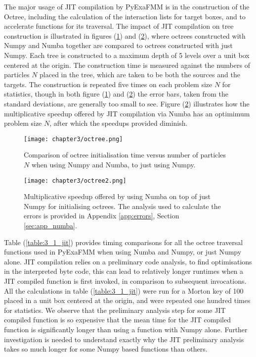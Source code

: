 The major usage of \gls{JIT} compilation by \gls{PyExaFMM} is in the construction
of the Octree, including the calculation of the interaction lists for target
boxes, and to accelerate functions for its traversal. The impact of \gls{JIT}
compilation on tree construction is illustrated in figures
(\ref{fig:3_1_octree}) and (\ref{fig:3_1_octree2}), where octrees constructed with
Numpy and Numba together are compared to octrees constructed with just Numpy.
Each tree is constructed to a maximum depth of 5 levels over a unit box
centered at the origin. The construction time is measured against
the numbers of particles $N$ placed in the tree, which are taken to be
both the sources and the targets. The construction
is repeated five times on each problem size $N$ for statistics, though in both
figure (\ref{fig:3_1_octree}) and (\ref{fig:3_1_octree2}) the error bars, taken
from the standard deviations, are generally too small to see. Figure (\ref{fig:3_1_octree2})
illustrates how the multiplicative speedup offered by \gls{JIT} compilation via
Numba has an optimimum problem size $N$, after which the speedups provided diminish.

\begin{figure}[ht]
    \centering

  {\texttt{[image: chapter3/octree.png]}}
  \vspace{0pt}
    \caption{
        Comparison of octree initialisation time versus number of particles $N$
        when using Numpy and Numba, to just using Numpy.
    }
    \label{fig:3_1_octree}
\end{figure}

\begin{figure}[ht]
    \centering

  {\texttt{[image: chapter3/octree2.png]}}
  \vspace{0pt}
    \caption{
        Multiplicative speedup offered by using Numba on top of just Numpy for
        initialising octrees.
        The analysis used to calculate the errors is provided in
        Appendix \ref{app:errors}, Section \ref{sec:app_numba}.
    }
    \label{fig:3_1_octree2}
\end{figure}

Table (\ref{table:3_1_jit}) provides timing comparisons for all the octree traversal
functions used in \gls{PyExaFMM} when using Numba and Numpy, or just Numpy alone.
\gls{JIT} compilation relies on a preliminary code analysis, to find optimisations
in the interpreted byte code, this can lead to relatively longer runtimes when
a \gls{JIT} compiled function is first invoked, in comparison to subsequent
invocations. All the calculations in table (\ref{table:3_1_jit}) were run for a
Morton key of 100 placed in a unit box centered at the origin, and were repeated
one hundred times for statistics. We observe that the preliminary analysis step for
some \gls{JIT} compiled function is so expensive that the mean time for the \gls{JIT}
compiled function is significantly longer than using a function with Numpy alone.
Further investigation is needed to understand exactly why the \gls{JIT} preliminary
analysis takes so much longer for some Numpy based functions than others.

